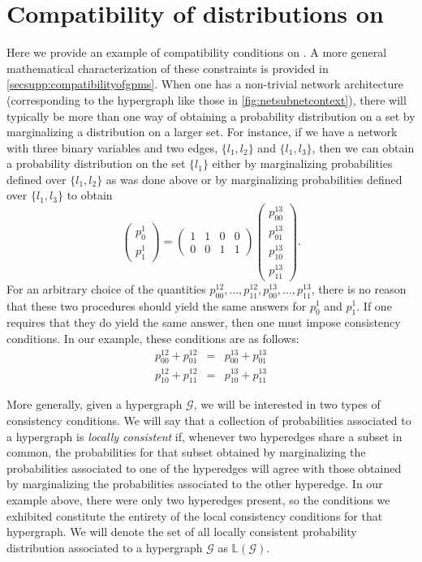 \section{Compatibility of distributions on \gnpm{}}\label{sec:compatibilityofgpms}
Here we provide an example of compatibility conditions on \gnpm{}. A more general mathematical characterization of these constraints is provided in  \ref{secsupp:compatibilityofgpms}. When one has a non-trivial network architecture (corresponding to the \SH{} hypergraph like those in \ref{fig:netsubnetcontext}), there will typically be more
than one way of obtaining a probability distribution on a set by
marginalizing a distribution on a larger set.  For instance, if we have
a network with three binary variables and two edges, $\{l_1,l_2\}$ and
$\{l_1,l_3\}$, then we can obtain a probability distribution on the
set $\{l_1\}$ either by marginalizing probabilities defined over
$\{l_1,l_2\}$ as was done above or by marginalizing probabilities
defined over $\{l_1,l_3\}$ to obtain
\begin{equation}
 \begin{pmatrix}
  p^{1}_{0}\\
  p^{1}_{1}
 \end{pmatrix} =
 \begin{pmatrix}
  1 & 1 & 0 & 0\\
  0 & 0 & 1 & 1
 \end{pmatrix}
 \begin{pmatrix}
  p^{13}_{00}\\
  p^{13}_{01}\\
  p^{13}_{10}\\
  p^{13}_{11}
 \end{pmatrix}.
\end{equation}
For an arbitrary choice of the quantities $p^{12}_{00}, \ldots,
p^{12}_{11}, p^{13}_{00}, \ldots, p^{13}_{11}$, there is no reason
that these two procedures should yield the same answers for $p^1_0$
and $p^1_1$.  If one requires that they do yield the same answer, then
one must impose consistency conditions.   In our example, these
conditions are as follows:
\begin{eqnarray}
 p^{12}_{00} + p^{12}_{01} &=&
  p^{13}_{00} + p^{13}_{01}\\
 p^{12}_{10} + p^{12}_{11} &=&
  p^{13}_{10} + p^{13}_{11}
\end{eqnarray}

More generally, given a hypergraph $\mathcal{G}$, we will be
interested in two types of consistency conditions.  We will say that a
collection of probabilities associated to a hypergraph is
\emph{locally consistent} if, whenever two hyperedges share a subset in
common, the probabilities for that subset obtained by marginalizing
the probabilities associated to one of the hyperedges will agree with
those obtained by marginalizing the probabilities associated to the
other hyperedge.  In our example above, there were only two hyperedges
present, so the conditions we exhibited constitute the entirety of the
local consistency conditions for that hypergraph.  We will denote the
set of all locally consistent probability distribution associated to a
hypergraph $\mathcal{G}$ as $\mathbb{L}(\mathcal{G})$.


